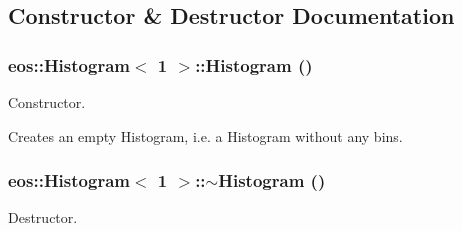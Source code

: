\subsection{Constructor \& Destructor Documentation}
\hypertarget{classeos_1_1Histogram_3_011_01_4_a474cfef8ca45667e839aea82cbccc75b}{
\subsubsection[{Histogram}]{\setlength{\rightskip}{0pt plus 5cm}eos::Histogram$<$ 1 $>$::Histogram ()}}
\label{classeos_1_1Histogram_3_011_01_4_a474cfef8ca45667e839aea82cbccc75b}
Constructor.

Creates an empty Histogram, i.e. a Histogram without any bins. \hypertarget{classeos_1_1Histogram_3_011_01_4_ae1c6c89b704ae90ca03fff94124d3124}{
\subsubsection[{$\sim$Histogram}]{\setlength{\rightskip}{0pt plus 5cm}eos::Histogram$<$ 1 $>$::$\sim$Histogram ()}}
\label{classeos_1_1Histogram_3_011_01_4_ae1c6c89b704ae90ca03fff94124d3124}


Destructor. 

